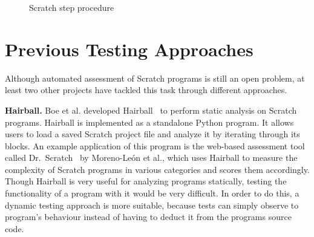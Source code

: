 \begin{figure}[htpb]

    \caption{Scratch step procedure}
    \label{fig:scratch_step_procedure}
\end{figure}

\section{Previous Testing Approaches}%
\label{sec:previous_testing_approaches}

Although automated assessment of Scratch programs is still an open problem,
at least two other projects have tackled this task through different approaches.
\parspace

\textbf{Hairball.}
Boe et al. developed Hairball~\cite{hairball} to perform static analysis on Scratch programs.
Hairball is implemented as a standalone Python program.
It allows users to load a saved Scratch project file and analyze it by iterating through its blocks.
An example application of this program is the web-based assessment tool called Dr.\ Scratch~\cite{drscratch} by Moreno-Le\'on et al.,
which uses Hairball to measure the complexity of Scratch programs in various categories and scores them accordingly.
Though Hairball is very useful for analyzing programs statically, testing the functionality of a program with it would be very difficult.
In order to do this, a dynamic testing approach is more suitable, because tests can simply observe to program's behaviour instead of having to deduct it from the programs source code.
\parspace

